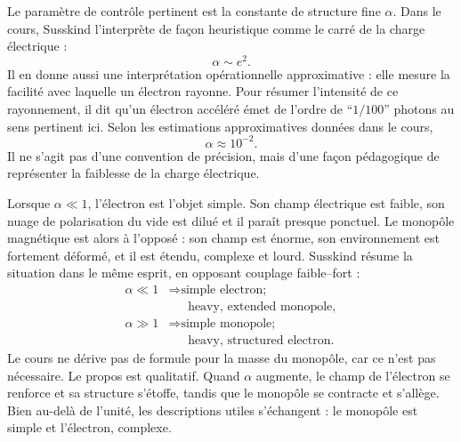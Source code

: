Le paramètre de contrôle pertinent est la constante de structure fine \(\alpha\). Dans le cours, Susskind l’interprète de façon heuristique comme le carré de la charge électrique :
\begin{equation}
\alpha \sim e^2.
\end{equation}
Il en donne aussi une interprétation opérationnelle approximative : elle mesure la facilité avec laquelle un électron rayonne. Pour résumer l’intensité de ce rayonnement, il dit qu’un électron accéléré émet de l’ordre de ``\(1/100\)'' photons au sens pertinent ici. Selon les estimations approximatives données dans le cours,
\begin{equation}
\alpha \approx 10^{-2}.
\end{equation}
Il ne s’agit pas d’une convention de précision, mais d’une façon pédagogique de représenter la faiblesse de la charge électrique.


Lorsque \(\alpha\ll 1\), l’électron est l’objet simple. Son champ électrique est faible, son nuage de polarisation du vide est dilué et il paraît presque ponctuel. Le monopôle magnétique est alors à l’opposé : son champ est énorme, son environnement est fortement déformé, et il est étendu, complexe et lourd. Susskind résume la situation dans le même esprit, en opposant couplage faible--fort :
\begin{equation}
\begin{aligned}
\alpha \ll 1
&\Rightarrow \text{simple electron;}\\
&\phantom{\Rightarrow{}}\text{heavy, extended monopole},\\
\alpha \gg 1
&\Rightarrow \text{simple monopole;}\\
&\phantom{\Rightarrow{}}\text{heavy, structured electron}.
\end{aligned}
\end{equation}
Le cours ne dérive pas de formule pour la masse du monopôle, car ce n’est pas nécessaire. Le propos est qualitatif. Quand \(\alpha\) augmente, le champ de l’électron se renforce et sa structure s’étoffe, tandis que le monopôle se contracte et s’allège. Bien au-delà de l’unité, les descriptions utiles s’échangent : le monopôle est simple et l’électron, complexe.

